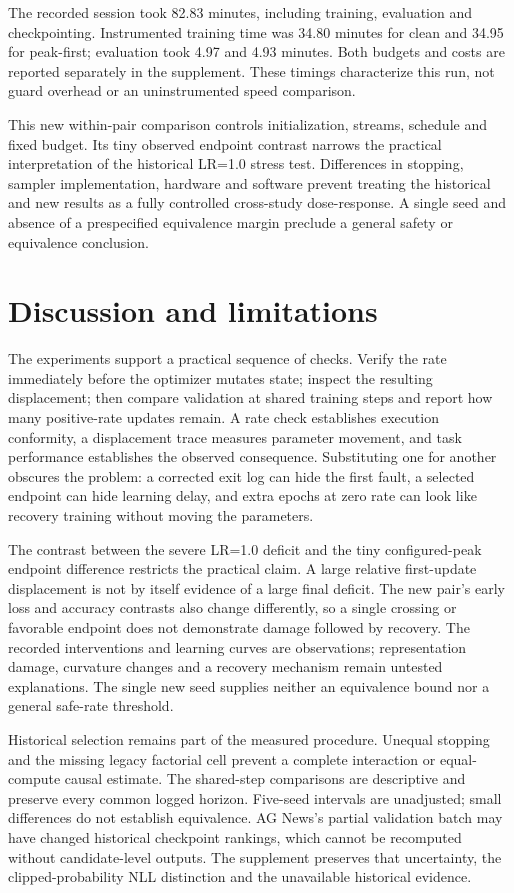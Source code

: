 \documentclass[referee,pdflatex,sn-mathphys-num]{sn-jnl}
\begin{document}
The recorded session took 82.83 minutes, including training, evaluation and checkpointing. Instrumented training time was 34.80 minutes for clean and 34.95 for peak-first; evaluation took 4.97 and 4.93 minutes. Both budgets and costs are reported separately in the supplement. These timings characterize this run, not guard overhead or an uninstrumented speed comparison.

This new within-pair comparison controls initialization, streams, schedule and fixed budget. Its tiny observed endpoint contrast narrows the practical interpretation of the historical LR=1.0 stress test. Differences in stopping, sampler implementation, hardware and software prevent treating the historical and new results as a fully controlled cross-study dose-response. A single seed and absence of a prespecified equivalence margin preclude a general safety or equivalence conclusion.

\section{Discussion and limitations}\label{discussion-and-limitations}

The experiments support a practical sequence of checks. Verify the rate immediately before the optimizer mutates state; inspect the resulting displacement; then compare validation at shared training steps and report how many positive-rate updates remain. A rate check establishes execution conformity, a displacement trace measures parameter movement, and task performance establishes the observed consequence. Substituting one for another obscures the problem: a corrected exit log can hide the first fault, a selected endpoint can hide learning delay, and extra epochs at zero rate can look like recovery training without moving the parameters.

The contrast between the severe LR=1.0 deficit and the tiny configured-peak endpoint difference restricts the practical claim. A large relative first-update displacement is not by itself evidence of a large final deficit. The new pair's early loss and accuracy contrasts also change differently, so a single crossing or favorable endpoint does not demonstrate damage followed by recovery. The recorded interventions and learning curves are observations; representation damage, curvature changes and a recovery mechanism remain untested explanations. The single new seed supplies neither an equivalence bound nor a general safe-rate threshold.

Historical selection remains part of the measured procedure. Unequal stopping and the missing legacy factorial cell prevent a complete interaction or equal-compute causal estimate. The shared-step comparisons are descriptive and preserve every common logged horizon. Five-seed intervals are unadjusted; small differences do not establish equivalence. AG News's partial validation batch may have changed historical checkpoint rankings, which cannot be recomputed without candidate-level outputs. The supplement preserves that uncertainty, the clipped-probability NLL distinction and the unavailable historical evidence.
\end{document}
